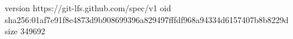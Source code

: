 version https://git-lfs.github.com/spec/v1
oid sha256:01af7e91f8e4873d9b908699396a829497fffdf968a94334d6157407b8b8229d
size 349692
